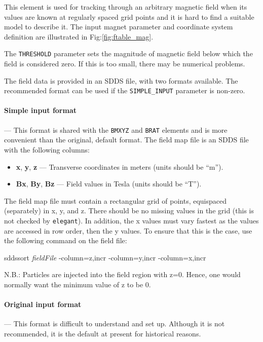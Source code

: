 This element is used for tracking through an arbitrary magnetic field
when its values are known at regularly spaced grid points and it is
hard to find a suitable model to describe it. The input magnet
parameter and coordinate system definition are illustrated in
Fig:\ref{fig:ftable_mag}. 

The \verb|THRESHOLD| parameter sets the magnitude of magnetic field below which the
field is considered zero. If this is too small, there may be numerical problems.

The field data is provided in an SDDS file, with two formats available. The recommended
format can be used if the \verb|SIMPLE_INPUT| parameter is non-zero.

\paragraph{Simple input format} --- This format is shared with the \verb|BMXYZ| and
\verb|BRAT| elements and is more convenient than the original, default format.
The field map file is an SDDS file with the following columns:
\begin{itemize}
\item {\bf x}, {\bf y}, {\bf z} --- Transverse coordinates in meters (units should be ``m'').
\item {\bf Bx}, {\bf By}, {\bf Bz} --- Field values in Tesla (units should be ``T'').
\end{itemize}

The field map file must contain a rectangular grid of points,
equispaced (separately) in x, y, and z.  There should be no missing values
in the grid (this is not checked by {\tt elegant}).  In addition, the
x values must vary fastest as the values are accessed in row order, then the y values.
To ensure that this is the case, use the following command on the field
file:
\begin{flushleft}
sddssort {\em fieldFile} -column=z,incr -column=y,incr -column=x,incr
\end{flushleft}

N.B.: Particles are injected into the field region with z=0. Hence, one would normally want
the minimum value of z to be 0.

\paragraph{Original input format} --- This format is difficult to understand and
set up. Although it is not recommended, it is the default at present for historical
reasons.

